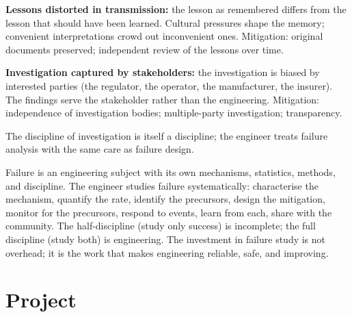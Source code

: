 \textbf{Lessons distorted in transmission:} the lesson as remembered differs from the lesson that should have been learned. Cultural pressures shape the memory; convenient interpretations crowd out inconvenient ones. Mitigation: original documents preserved; independent review of the lessons over time.

\textbf{Investigation captured by stakeholders:} the investigation is biased by interested parties (the regulator, the operator, the manufacturer, the insurer). The findings serve the stakeholder rather than the engineering. Mitigation: independence of investigation bodies; multiple-party investigation; transparency.

The discipline of investigation is itself a discipline; the engineer treats failure analysis with the same care as failure design.

\begin{principle}
Failure is an engineering subject with its own mechanisms, statistics, methods, and discipline. The engineer studies failure systematically: characterise the mechanism, quantify the rate, identify the precursors, design the mitigation, monitor for the precursors, respond to events, learn from each, share with the community. The half-discipline (study only success) is incomplete; the full discipline (study both) is engineering. The investment in failure study is not overhead; it is the work that makes engineering reliable, safe, and improving.
\end{principle}

\section{Project}

